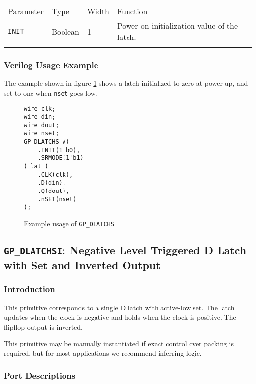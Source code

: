 \documentclass[11pt]{article}
\newcommand{\tokenstyle}[1]{\texttt{#1}}
\newcommand{\wirestyle}[1]{\texttt{#1}}
\newcommand{\whenstyle}[1]{{\fontseries{sb}\selectfont#1}}
\newcommand{\thinhline}{\Xhline{1\arrayrulewidth}}
\newcommand{\thickhline}{\Xhline{2.5\arrayrulewidth}}
\begin{document}
\begin{tabularx}{\textwidth}{lllX}
\thinhline
\whenstyle{Parameter} & \whenstyle{Type} & \whenstyle{Width} & \whenstyle{Function} \\
\thickhline
\tokenstyle{INIT} & Boolean & 1 & Power-on initialization value of the latch.\\
\thinhline
\end{tabularx}

\subsubsection{Verilog Usage Example}

The example shown in figure \ref{gp-dlatchs-example} shows a latch initialized to zero at power-up, and set to one
when \wirestyle{nset} goes low.

\begin{figure}[h]
\begin{lstlisting}
wire clk;
wire din;
wire dout;
wire nset;
GP_DLATCHS #(
	.INIT(1'b0),
	.SRMODE(1'b1)
) lat (
	.CLK(clk),
	.D(din),
	.Q(dout),
	.nSET(nset)
);
\end{lstlisting}
\caption{Example usage of \tokenstyle{GP\_DLATCHS}}
\label{gp-dlatchs-example}
\end{figure}


\pagebreak
\subsection{\tokenstyle{GP\_DLATCHSI}: Negative Level Triggered D Latch with Set and Inverted Output}
\label{gp-latchsi}

\subsubsection{Introduction}
This primitive corresponds to a single D latch with active-low set. The latch updates when the clock is negative and holds 
when the clock is positive. The flipflop output is inverted.

This primitive may be manually instantiated if exact control over packing is required, but for most applications we
recommend inferring logic.

\subsubsection{Port Descriptions}
\end{document}
